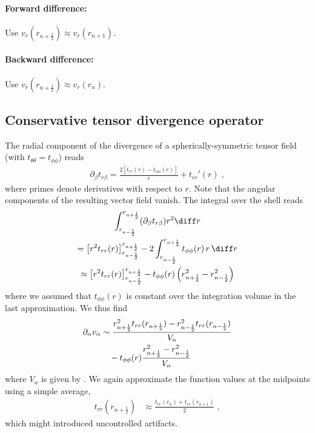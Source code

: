 \documentclass[
	superscriptaddress,
	twocolumn,
	aps, pre
]{revtex4-1}
\begin{document}
\paragraph{Forward difference:}
Use $v_r(r_{n + \frac12}) \approx v_r(r_{n+1})$.

\paragraph{Backward difference:}
Use $v_r(r_{n + \frac12}) \approx v_r(r_{n})$.



\subsection{Conservative tensor divergence operator}
The radial component of the divergence of a spherically-symmetric tensor field (with $t_{\theta\theta} = t_{\phi\phi}$) reads
\begin{align}
	\partial_\beta t_{r\beta} =
		\frac{2 \left[t_{rr}(r)-t_{\phi \phi }(r)\right]}{r}+t_{rr}'(r)
	\;,
\end{align}
where primes denote derivatives with respect to $r$.
Note that the angular components of the resulting vector field vanish.
The integral over the shell reads
\begin{multline}
	\int_{r_{n-\frac12}}^{r_{n + \frac12}} (\partial_\beta t_{r\beta})  r^2 \diff r 
\\	
	 = \left[r^2 t_{rr}(r)\right]_{r_{n-\frac12}}^{r_{n + \frac12}}
	  - 2 \int_{r_{n-\frac12}}^{r_{n + \frac12}} t_{\phi \phi }(r) \, r \, \diff r 
\\
	 \approx \left[r^2 t_{rr}(r)\right]_{r_{n-\frac12}}^{r_{n + \frac12}}
	  - t_{\phi \phi }(r) \left(
	  	r_{n+\frac12}^2 - r_{n-\frac12}^2
	  \right)
\end{multline}
where we assumed that $t_{\phi\phi}(r)$ is constant over the integration volume in the last approximation.
We thus find
\begin{align}
	\partial_\alpha v_{\alpha} &\sim
	 \frac{r_{n + \frac12}^2 t_{rr}(r_{n + \frac12}) - r_{n - \frac12}^2 t_{rr}(r_{n - \frac12})}{V_n}
\\\notag & \quad - t_{\phi \phi }(r) \frac{r_{n+\frac12}^2 - r_{n-\frac12}^2}{V_n}
\end{align}
where $V_n$ is given by . 
We again approximate the function values at the midpoints using a simple average,
\begin{align}
	t_{rr}(r_{n + \frac12}) &\approx \frac{t_{rr}(r_{n}) + t_{rr}(r_{n+1})}{2}
	\;,
\end{align}
which might introduced uncontrolled artifacts.
\end{document}
